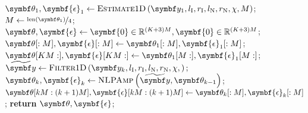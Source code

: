 \begin{algorithm}
    \caption[
        The proposed routine for estimating a sequence of amplitude-attenuated
        \acsp{FID}.
    ]
    {
        The proposed routine for estimating a sequence of amplitude-attenuated
        \acsp{FID}.
        \textsc{NLPAmp} denotes a
        routine which is akin to \textsc{NLP} (\cref{alg:nlp}), except
        only amplitudes are optimised; phases, frequencies and damping factors
        are fixed.
    }
    \label{alg:estimate-seq}
    \begin{algorithmic}[1]
        \State $\bth_{1}, \symbf{\epsilon}_{1} \gets \textsc{Estimate$1$D}\left(
            \by_1,
            l_{\text{I}},
            r_{\text{I}},
            l_{\text{N}},
            r_{\text{N}},
            \chi,
            M
            \right)
        $;
        \State $M \gets \nicefrac{\text{len}(\bth_{1})}{4}$;
        \State $\bth, \symbf{\epsilon} \gets  \symbf{0} \in \mathbb{R}^{(K + 3)M}, \symbf{0} \in \mathbb{R}^{(K + 3)M}$;
        \State $\bth[:M], \symbf{\epsilon}[:M] \gets \bth_{1}[:M], \symbf{\epsilon}_{1}[:M]$;
        \State $\bth[KM:], \symbf{\epsilon}[KM:] \gets \bth_{1}[M:], \symbf{\epsilon}_{1}[M:]$;
            \State $\widetilde{\by} \gets \textsc{Filter$1$D}\left(
                \by_k,
                l_{\text{I}},
                r_{\text{I}},
                l_{\text{N}},
                r_{\text{N}},
                \chi,
                \right);
                $
            \State $\bth_{k}, \symbf{\epsilon}_{k} \gets
            \textsc{NLPAmp}\left(\widetilde{\by}, \bth_{k-1}\right)$;
            \State $\bth[kM : (k+1)M], \symbf{\epsilon}[kM : (k+1)M] \gets \bth_k[:M], \symbf{\epsilon}_k[:M]$;
        \EndFor
        \State \textbf{return} $\bth, \symbf{\epsilon}$;
        \EndProcedure
    \end{algorithmic}
\end{algorithm}



